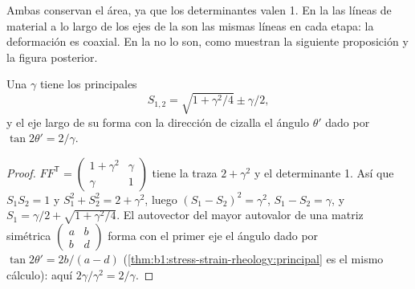 Ambas conservan el área, ya que los determinantes valen 1. En la  las líneas de material a lo largo de los ejes de la  son las
mismas líneas en cada etapa: la deformación es coaxial. En la  no lo son, como muestran la siguiente proposición y la figura posterior.

\begin{proposition}\label{prop:b1:stress-strain-rheology:simple-shear}
Una  $\gamma$ tiene los  principales
\[
  S_{1,2} = \sqrt{1 + \gamma^2/4} \pm \gamma/2 ,
\]
y el eje largo de su  forma con la dirección de cizalla el ángulo $\theta'$ dado por $\tan2\theta' = 2/\gamma$.
\end{proposition}

\begin{proof}
$FF^{\mathsf T} = \begin{pmatrix} 1+\gamma^2 & \gamma \\ \gamma & 1\end{pmatrix}$ tiene la traza $2+\gamma^2$ y el determinante 1. Así que $S_1S_2 = 1$ y
$S_1^2 + S_2^2 = 2 + \gamma^2$, luego $(S_1 - S_2)^2 = \gamma^2$, $S_1 - S_2 = \gamma$, y $S_1 = \gamma/2 + \sqrt{1+\gamma^2/4}$. El autovector del mayor autovalor de
una matriz simétrica $\begin{pmatrix} a & b \\ b & d\end{pmatrix}$ forma con el primer eje el ángulo dado por $\tan2\theta' = 2b/(a-d)$
(\cref{thm:b1:stress-strain-rheology:principal} es el mismo cálculo): aquí $2\gamma/\gamma^2 = 2/\gamma$.
\end{proof}

